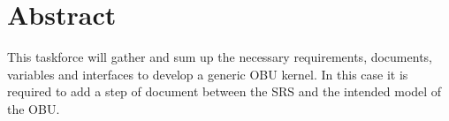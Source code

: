 \documentclass{template/openetcs_article}
\begin{document}
\tableofcontents
\listoffiguresandtables
\newpage















\section{Abstract}
This taskforce will gather and sum up the necessary requirements, documents, variables and interfaces to develop a generic OBU kernel. In this case it is required to add a step of document between the SRS and the intended model of the OBU. 
\end{document}
